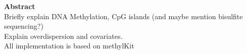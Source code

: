 \textbf{Abstract}\\
Briefly explain DNA Methylation, CpG islands (and maybe mention bisulfite sequencing?)\\
Explain overdispersion and covariates.\\
All implementation is based on methylKit \cite{23034086}
  
  
  
  